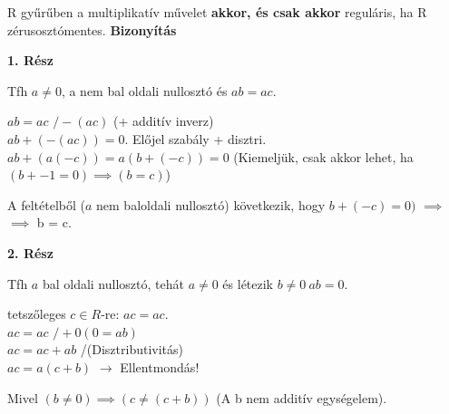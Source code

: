 \begin{frame}
  \begin{tcolorbox}[title={Lemma: Nullosztó és regularitás}]
    R gyűrűben a multiplikatív művelet \textbf{akkor, és csak akkor} reguláris, ha R zérusosztómentes.
  \tcblower
    \textbf{Bizonyítás}\\
    \mmedskip

    \textbf{1. Rész}\\
    \msmallskip
    
    Tfh $a \neq 0$, a nem bal oldali nullosztó és $ab = ac$.\\
    \msmallskip
    
    $ab = ac$  $/ -(ac)$ (+ additív inverz)\\
    $ab + (-(ac)) = 0$. Előjel szabály + disztri.\\
    $ab + (a(-c)) = a(b+(-c)) = 0$ (Kiemeljük, csak akkor lehet, ha $(b + -1 = 0) \implies (b = c)$)\\
    \msmallskip
    
    A feltételből ($a$ nem baloldali nullosztó) következik, hogy $b + (-c) = 0)$ $\implies$\\
    $\implies$ b = c.\\
    \bigskip

    \textbf{2. Rész}\\
    \msmallskip
    
    Tfh $a$ bal oldali nullosztó, tehát $a \neq 0$ és létezik $b \neq 0\: ab = 0$.\\
    \msmallskip
    
    tetszőleges $c \in R$-re: $ac = ac$.\\
    $ac = ac$  $/ +0 (0 = ab)$\\
    $ac = ac + ab$ /(Disztributivitás)\\
    $ac = a(c + b)$ $\rightarrow$ Ellentmondás!\\
    \msmallskip
    
    Mivel $(b \neq 0) \implies (c \neq (c + b))$ (A b nem additív egységelem).
  \end{tcolorbox}
\end{frame}

